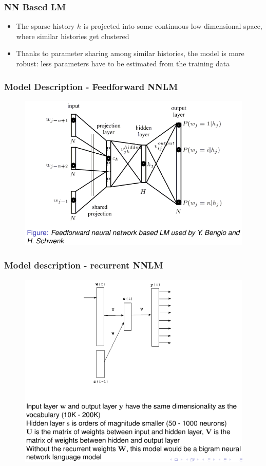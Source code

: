 \documentclass{beamer}
\begin{document}
\begin{frame}\frametitle{NN Based LM}

\begin{itemize}
\item The sparse history $h$ is projected into some continuous
low-dimensional space, where similar histories get
clustered
\item Thanks to parameter sharing among similar histories, the
model is more robust: less parameters have to be
estimated from the training data
\end{itemize}
\end{frame}
\begin{frame}\frametitle{Model Description - Feedforward NNLM}
\begin{figure}
\includegraphics[width=0.8\linewidth]{figure/nnlm.pdf}
\end{figure}
\end{frame}
\begin{frame}\frametitle{Model description - recurrent NNLM}
\begin{figure}
\includegraphics[width=0.75\linewidth]{figure/rnnlm.pdf}
\end{figure}
\end{frame}
\end{document}
